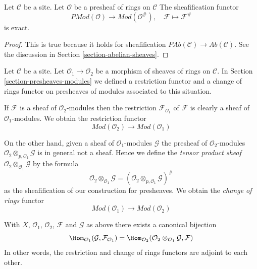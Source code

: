 \begin{lemma}
\label{lemma-sheafification-exact}
Let $\mathcal{C}$ be a site.
Let $\mathcal{O}$ be a presheaf of rings on $\mathcal{C}$
The sheafification functor
$$
\textit{PMod}(\mathcal{O}) \longrightarrow \textit{Mod}(\mathcal{O}^\#), \quad
\mathcal{F} \longmapsto \mathcal{F}^\#
$$
is exact.
\end{lemma}

\begin{proof}
This is true because it holds for sheafification
$\textit{PAb}(\mathcal{C}) \to \textit{Ab}(\mathcal{C})$.
See the discussion in Section \ref{section-abelian-sheaves}.
\end{proof}

\noindent
Let $\mathcal{C}$ be a site.
Let $\mathcal{O}_1 \to \mathcal{O}_2$ be
a morphism of sheaves of rings on $\mathcal{C}$.
In Section \ref{section-presheaves-modules}
we defined a restriction functor
and a change of rings functor on presheaves of modules
associated to this situation.

\medskip\noindent
If $\mathcal{F}$ is a sheaf of $\mathcal{O}_2$-modules
then the restriction $\mathcal{F}_{\mathcal{O}_1}$
of $\mathcal{F}$ is clearly a sheaf
of $\mathcal{O}_1$-modules. We obtain the restriction functor
$$
\textit{Mod}(\mathcal{O}_2)
\longrightarrow
\textit{Mod}(\mathcal{O}_1)
$$

\medskip\noindent
On the other hand, given a sheaf of $\mathcal{O}_1$-modules
$\mathcal{G}$ the presheaf of $\mathcal{O}_2$-modules
$\mathcal{O}_2 \otimes_{p, \mathcal{O}_1} \mathcal{G}$
is in general not a sheaf. Hence we define the
{\it tensor product sheaf}
$\mathcal{O}_2 \otimes_{\mathcal{O}_1} \mathcal{G}$
by the formula
$$
\mathcal{O}_2 \otimes_{\mathcal{O}_1} \mathcal{G}
=
(\mathcal{O}_2 \otimes_{p, \mathcal{O}_1} \mathcal{G})^\#
$$
as the sheafification of our construction for presheaves.
We obtain the {\it change of rings} functor
$$
\textit{Mod}(\mathcal{O}_1)
\longrightarrow
\textit{Mod}(\mathcal{O}_2)
$$

\begin{lemma}
\label{lemma-adjointness-tensor-restrict}
With $X$, $\mathcal{O}_1$, $\mathcal{O}_2$, $\mathcal{F}$ and
$\mathcal{G}$ as above there exists a canonical bijection
$$
\Hom_{\mathcal{O}_1}(\mathcal{G}, \mathcal{F}_{\mathcal{O}_1})
=
\Hom_{\mathcal{O}_2}(
\mathcal{O}_2 \otimes_{\mathcal{O}_1} \mathcal{G},
\mathcal{F}
)
$$
In other words, the restriction and change of rings functors
are adjoint to each other.
\end{lemma}

